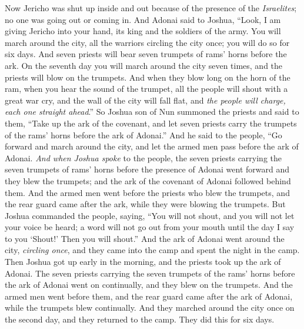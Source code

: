 \begin{biblechapter} %
 Now Jericho was shut up inside and out because of the presence of the \textit{Israelites}; no one was going out or coming in.
\verse And Adonai said to Joshua, “Look, I am giving Jericho into your hand, its king and the soldiers of the army.
\verse You will march around the city, all the warriors circling the city once; you will do so for six days.
\verse And seven priests will bear seven trumpets of rams’ horns before the ark. On the seventh day you will march around the city seven times, and the priests will blow on the trumpets.
\verse And when they blow long on the horn of the ram, when you hear the sound of the trumpet, all the people will shout with a great war cry, and the wall of the city will fall flat, and \textit{the people will charge, each one straight ahead}.”
\verse So Joshua son of Nun summoned the priests and said to them, “Take up the ark of the covenant, and let seven priests carry the trumpets of the rams’ horns before the ark of Adonai.”
\verse And he said to the people, “Go forward and march around the city, and let the armed men pass before the ark of Adonai.
\verse \textit{And when Joshua spoke} to the people, the seven priests carrying the seven trumpets of rams’ horns before the presence of Adonai went forward and they blew the trumpets; and the ark of the covenant of Adonai followed behind them.
\verse And the armed men went before the priests who blew the trumpets, and the rear guard came after the ark, while they were blowing the trumpets.
\verse But Joshua commanded the people, saying, “You will not shout, and you will not let your voice be heard; a word will not go out from your mouth until the day I say to you ‘Shout!’ Then you will shout.”
\verse And the ark of Adonai went around the city, \textit{circling once}, and they came into the camp and spent the night in the camp.
\verse Then Joshua got up early in the morning, and the priests took up the ark of Adonai.
\verse The seven priests carrying the seven trumpets of the rams’ horns before the ark of Adonai went on continually, and they blew on the trumpets. And the armed men went before them, and the rear guard came after the ark of Adonai, while the trumpets blew continually.
\verse And they marched around the city once on the second day, and they returned to the camp. They did this for six days.

\end{biblechapter}
